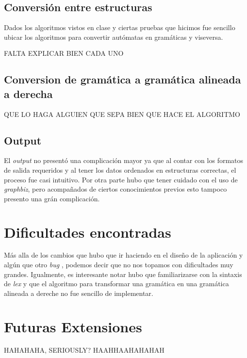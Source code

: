 \documentclass[a4paper,10pt]{article}
\begin{document}
      \subsection{Conversión entre estructuras}
            Dados los algoritmos vistos en clase y ciertas pruebas que hicimos fue sencillo ubicar los algoritmos
            para convertir autómatas en gramáticas y viseversa.

            FALTA EXPLICAR BIEN CADA UNO
      \subsection{Conversion de gramática a gramática alineada a derecha}
            QUE LO HAGA ALGUIEN QUE SEPA BIEN QUE HACE EL ALGORITMO
      \subsection{Output}
            El \textit{output} no presentó una complicación mayor ya que al contar con los formatos de salida 
            requeridos y al tener los datos ordenados en estructuras correctas, el proceso fue casi intuitivo.
            Por otra parte hubo que tener cuidado con el uso de \textit{graphbiz}, pero acompañados de ciertos
            conocimientos previos esto tampoco presento una grán complicación.

\newpage

\section{Dificultades encontradas}
    Más alla de los cambios que hubo que ir haciendo en el diseño de la aplicación y algún que otro \textit{bug} 
    , podemos decir que no nos topamos con dificultades muy grandes. Igualmente, es interesante notar hubo que 
    familiarizarse con la sintaxis de \textit{lex} y que el algoritmo para transformar una gramática en una 
    gramática alineada a dereche no fue sencillo de implementar.
\newpage

\section{Futuras Extensiones}
    HAHAHAHA, SERIOUSLY? HAAHHAAHAHAHAH
\end{document}

